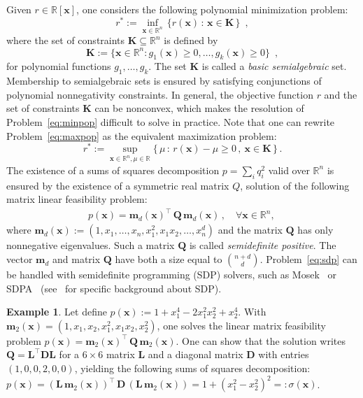\documentclass[a4paper,10pt]{article}
\newcommand{\R}{\mathbb{R}}
\newcommand{\x}{\mathbf{x}}
\def\Q{\mathbf{Q}}
\def\L{\mathbf{L}}
\def\D{\mathbf{D}}
\def\m{\mathbf{m}}
\def\m{\mathbf{m}}
\def\K{\mathbf{K}}
\def\Q{\mathbf{Q}}
\theoremstyle{plain}
\theoremstyle{definition}
\newtheorem{example}{Example}
\theoremstyle{remark}
\begin{document}
Given $r \in \R[\x]$, one considers the following polynomial minimization problem:
\begin{equation}
\label{eq:minpop}
r^*  :=  \inf_{\x \in \R^n} \, \{ r (\x) \, : \, \x \in \K \, \} \enspace,
\end{equation}
%
where the set of constraints $\K \subseteq \R^n$ is defined by
%
\[\K := \{ \x \in \R^{n} : g_1 (\x) \geq 0, \dots, g_k (\x) \geq 0\}\enspace,\]
for polynomial functions $g_1, \dots, g_k$. The set $\K$ is called a {\em basic semialgebraic} set. Membership to semialgebraic sets is ensured by satisfying conjunctions of polynomial nonnegativity constraints. 
In general, the objective function $r$ and the set of constraints $\K$ can be nonconvex, which makes the resolution of Problem~\eqref{eq:minpop} difficult to solve in practice. 
Note that one can rewrite Problem~\eqref{eq:maxpop} as the equivalent maximization problem:
\begin{equation}
\label{eq:maxpop}
r^*  :=  \sup_{\x \in \R^n, \mu \in \R} \{ \, \mu \, : \, r (\x) - \mu \geq 0 \,, \ \x \in \K \, \} \,.
\end{equation}
%
The existence of a sums of squares decomposition $p = \sum_i q_i^2$ valid
over $\R^n$ is ensured by the existence of a symmetric real matrix $Q$, solution of the following matrix linear feasibility problem:
\begin{align}
\label{eq:sdp}
p(\x) = \m_d(\x)^\intercal \, \Q \, \m_d(\x) \,, \quad \forall \x \in \R^n, \,
\end{align}
%
where $\m_d(\x) := (1, x_1, \dots, x_n, x_1^2,x_1 x_2,\dots, x_n^d)$ and the matrix $\Q$ has only nonnegative eigenvalues. Such a matrix $\Q$ is called {\em semidefinite positive}. The vector $\m_d$ and matrix $\Q$ have both a size equal to ${n + d \choose d}$. Problem~\eqref{eq:sdp} can be handled with semidefinite programming (SDP) solvers, such as {\sc Mosek}~\cite{mosek} or {\sc SDPA}~\cite{sdpa7} (see~\cite{Vandenberghe94SDP} for specific background about SDP).
%
\begin{example}
Let define $p(\x) := 1 + x_1^4 - 2 x_1^2 x_2^2 + x_2^4$. With $\m_2 (\x) = (1, x_1, x_2, x_1^2, x_1 x_2, x_2^2)$, one solves the linear matrix feasibility problem $p(\x) = \m_2 (\x)^\intercal \, \Q \, \m_2(\x)$. One can show that the solution writes $\Q = \L^\intercal \D \L$ for a $6 \times 6$ matrix $\L$ and a diagonal matrix $\D$ with entries $(1,0,0,2,0,0)$, yielding the following sums of squares decomposition: $p(\x) =  (\L \,
\m_2(\x))^\intercal \, \D \, (\L \, \m_2(\x)) = 1 + (x_1^2 - x_2^2)^2 =: \sigma(\x)$.
\end{example}
\end{document}
